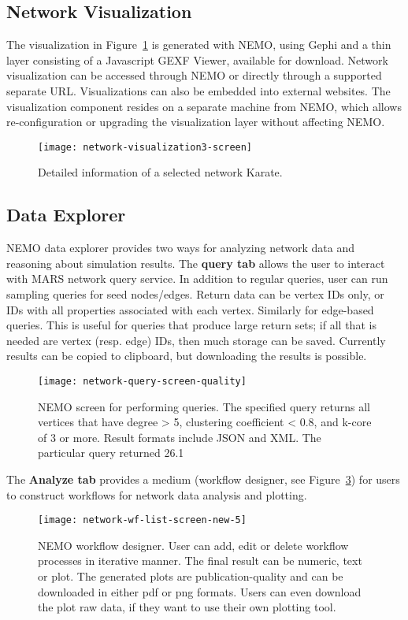 \subsection{Network Visualization}
The visualization in Figure~\ref{fig:network-visualization3-screen} is generated with NEMO, using Gephi and a thin layer consisting of a Javascript GEXF
Viewer, available for download. Network visualization can be accessed through NEMO or directly through a supported separate URL. Visualizations can also be embedded into external websites. The visualization component resides on a separate machine from NEMO, which allows re-configuration or upgrading the visualization layer without affecting NEMO.
\begin{figure}[H]
\centering
\texttt{[image: network-visualization3-screen]}
\caption{
Detailed information of a selected network Karate.
}   %
\label{fig:network-visualization3-screen}
\end{figure}

\subsection{Data Explorer}

NEMO data explorer provides two ways for analyzing network data and reasoning about simulation results. The \textbf{query tab} allows the user to interact with MARS network query service. In addition to regular queries, user can run sampling queries for seed nodes/edges. Return data can be vertex IDs only, or IDs with all properties associated with
each vertex. Similarly for edge-based queries. This is useful for queries that produce large return sets; if all that is needed
are vertex (resp. edge) IDs, then much storage can be saved. Currently results can be copied to clipboard, but downloading the results is possible.

\begin{figure}[H]
\centering
\texttt{[image: network-query-screen-quality]}
\caption{
NEMO screen for performing queries. The specified query returns all vertices that have degree > 5, clustering
coefficient < 0.8, and k-core of 3 or more. Result formats include JSON and XML. The particular
query returned 26.1%
}   %
\label{fig:network-query-screen-quality}
\end{figure}

The \textbf{Analyze tab} provides a medium (workflow designer, see Figure~\ref{fig:network-wf-list-screen-new-5}) for users to construct workflows for network data analysis and plotting. 
\begin{figure}[H]
\centering
\texttt{[image: network-wf-list-screen-new-5]}
\caption{
NEMO workflow designer. User can add, edit or delete workflow processes in iterative manner. The final result can be numeric, text or plot. The generated plots are publication-quality and can be downloaded  in either pdf or png formats. Users can even download the plot raw data, if they want to use their own plotting tool.
}   %
\label{fig:network-wf-list-screen-new-5}
\end{figure}
 
